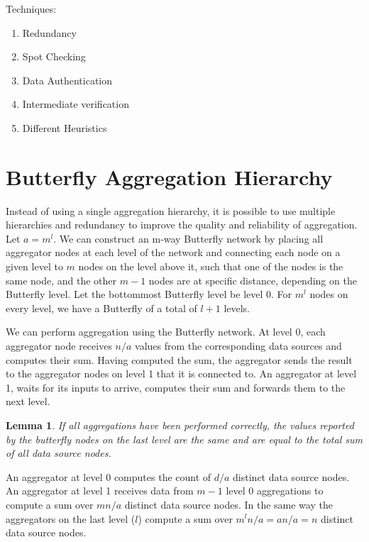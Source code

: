\documentclass{article}
\newtheorem{lem}[thm]{Lemma}
\newenvironment{proof}[1][Proof]{\begin{trivlist}
\item[\hskip \labelsep {\bfseries #1}]}{\end{trivlist}}
\begin{document}
Techniques:
\begin{enumerate}
  \item Redundancy
  \item Spot Checking
  \item Data Authentication
  \item Intermediate verification
  \item Different Heuristics
\end{enumerate}


\section{Butterfly Aggregation Hierarchy}
Instead of using a single aggregation hierarchy, it is possible to use
multiple hierarchies and redundancy to improve the quality and
reliability of aggregation. Let $a=m^l$. We can construct an m-way
Butterfly network by placing all aggregator nodes at each level of the network
and connecting each node on a given level to $m$ nodes on the level above
it, such that one of the nodes is the same node, and the other $m-1$
nodes are at specific distance, depending on the Butterfly level. Let
the bottommost Butterfly level be level 0. For $m^l$ nodes on 
every level, we have a Butterfly of a total of $l+1$ levels. 

We can perform aggregation using the Butterfly network. At level 0,
each aggregator node receives $n/a$ values from the corresponding data
sources and computes their sum. Having computed the sum, the
aggregator sends the result to the aggregator nodes on level 1 that it
is connected to. An aggregator at level 1, waits for its inputs to
arrive, computes their sum and forwards them to the next level. 

\begin{lem} If all aggregations have been performed correctly, the
  values reported by the butterfly nodes on the last level are the
  same and are equal to the total sum of all data source nodes.
\end{lem}

\begin{proof}
  An aggregator at level 0 computes the count of $d/a$ distinct data source
  nodes. An aggregator at level 1 receives data from  $m-1$ level 0
  aggregations to compute a sum over $mn/a$ distinct data source
  nodes. In the same way the aggregators on the last level ($l$)
  compute a sum over $m^ln/a = an/a = n$ distinct data source nodes.
\end{proof}
\end{document}
